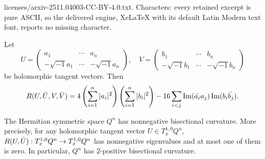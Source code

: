 \documentclass[10pt,a4paper]{amsart}
\DeclareMathOperator{\Imagine}{Im}
\begin{document}
licenses/arxiv-2511.04003-CC-BY-4.0.txt. Characters: every retained excerpt is pure ASCII, so the delivered engine, XeLaTeX with its default Latin Modern text font, reports no missing character.
\begin{lem}\label{lem:BisectionalCurvature}
    Let 
    \[U=\begin{pmatrix}
        a_1&\cdots&a_n\\
        -\sqrt{-1}a_1&\cdots&-\sqrt{-1}a_n
    \end{pmatrix},\quad V=\begin{pmatrix}
        b_1&\cdots&b_n\\
        -\sqrt{-1}b_1&\cdots&-\sqrt{-1}b_n
    \end{pmatrix}\]
    be holomorphic tangent vectors. Then 
    \begin{equation}\label{eq:BisectionalCurvature}
        R(U,\Bar{U},V,\Bar{V})=4\left(\sum_{i=1}^n|a_i|^2\right)\left(\sum_{i=1}^n|b_i|^2\right)-16\sum_{i<j}\Imagine(\Bar{a_i}a_j)\Imagine(b_i\Bar{b_j}).
    \end{equation}
\end{lem}

\begin{cor}
    The Hermitian symmetric space $Q^n$ has nonnegative bisectional curvature. More precisely, for any holomorphic tangent vector $U\in T^{1,0}_xQ^n$, $R(U,\Bar{U}):T_x^{1,0}Q^n\to T_x^{1,0}Q^n$ has nonnegative eigenvalues and at most one of them is zero. In particular, $Q^n$ has $2$-positive bisectional curvature.
\end{cor}
\end{document}
